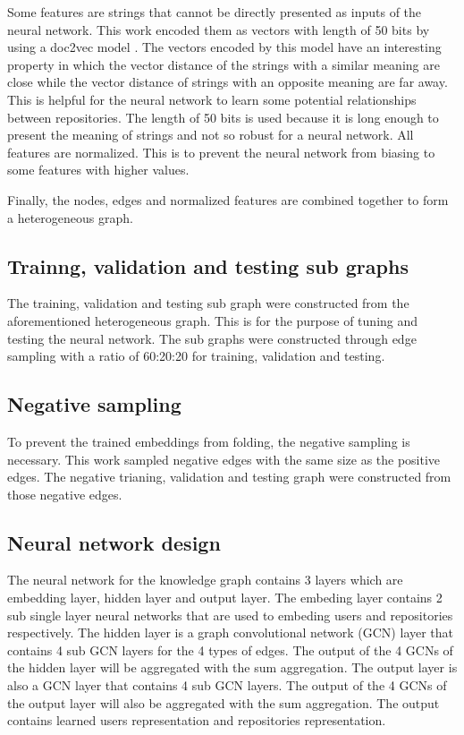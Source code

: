 \documentclass[11pt,twoside]{report}
\begin{document}
Some features are strings that cannot be directly presented as inputs of the neural network. This work encoded them as vectors with length of 50 bits by using a doc2vec model \cite{rehurek_lrec}. The vectors encoded by this model have an interesting property in which the vector distance of the strings with a similar meaning are close while the vector distance of strings with an opposite meaning are far away. This is helpful for the neural network to learn some potential relationships between repositories. The length of 50 bits is used because it is long enough to present the meaning of strings and not so robust for a neural network. All features are normalized. This is to prevent the neural network from biasing to some features with higher values.

Finally, the nodes, edges and normalized features are combined together to form a heterogeneous graph.

\subsection{Trainng, validation and testing sub graphs}
The training, validation and testing sub graph were constructed from the aforementioned heterogeneous graph. This is for the purpose of tuning and testing the neural network. The sub graphs were constructed through edge sampling with a ratio of 60:20:20 for training, validation and testing.

\subsection{Negative sampling}
To prevent the trained embeddings from folding, the negative sampling is necessary. This work sampled negative edges with the same size as the positive edges. The negative trianing, validation and testing graph were constructed from those negative edges.

\subsection{Neural network design}
The neural network for the knowledge graph contains 3 layers which are embedding layer, hidden layer and output layer. The embeding layer contains 2 sub single layer neural networks that are used to embeding users and repositories respectively. The hidden layer is a graph convolutional network (GCN) \cite{kipf_semi-supervised_2017} layer that contains 4 sub GCN layers for the 4 types of edges. The output of the 4 GCNs of the hidden layer will be aggregated with the sum aggregation. The output layer is also a GCN layer that contains 4 sub GCN layers. The output of the 4 GCNs of the output layer will also be aggregated with the sum aggregation. The output contains learned users representation and repositories representation.
\end{document}
